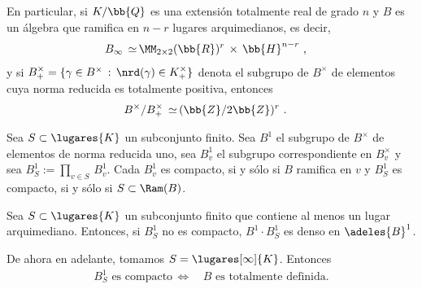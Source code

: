 
En particular, si $K/\bb{Q}$ es una extensi\'{o}n totalmente real de
grado $n$ y $B$ es un \'{a}lgebra que ramifica en $n-r$ lugares arquimedianos,
es decir,
\begin{align*}
 B_{\infty} \,\simeq\, & \MM_{2\times 2}(\bb{R})^{r} \,\times\,
	\bb{H}^{n-r}
	\text{ ,}
\end{align*}
%
y si
$B_{+}^{\times}=\{\gamma\in B^{\times}\,:\,\nrd(\gamma)\in K_{+}^{\times}\}$
denota el subgrupo de $B^{\times}$ de elementos cuya norma reducida es
totalmente positiva, entonces
\begin{align*}
	B^{\times}/B_{+}^{\times} \,\simeq\, & (\bb{Z}/2\bb{Z})^{r}
	\text{ .}
\end{align*}
%

Sea $S\subset\lugares{K}$ un subconjunto finito. Sea $B^{1}$
el subgrupo de $B^{\times}$ de elementos de norma reducida uno, sea
$B_{v}^{1}$ el subgrupo correspondiente en $B_{v}^{\times}$ y sea
$B_{S}^{1}:=\prod_{v\in S}\,B_{v}^{1}$. Cada $B_{v}^{1}$ es compacto, si
y s\'{o}lo si $B$ ramifica en $v$ y $B_{S}^{1}$ es compacto, si y s\'{o}lo
si $S\subset\Ram(B)$.

\begin{teoAproxFuerte}
	Sea $S\subset\lugares{K}$ un subconjunto finito que contiene al menos
	un lugar arquimediano. Entonces, si $B_{S}^{1}$ no es compacto,
	$B^{1}\cdot B_{S}^{1}$ es denso en $\adeles{B}^{1}$.
\end{teoAproxFuerte}

De ahora en adelante, tomamos $S=\lugares[\infty]{K}$. Entonces
\begin{align*}
	B_{S}^{1}\text{ es compacto}\,\Leftrightarrow\, &
	B\text{ es totalmente definida.}
\end{align*}
%

